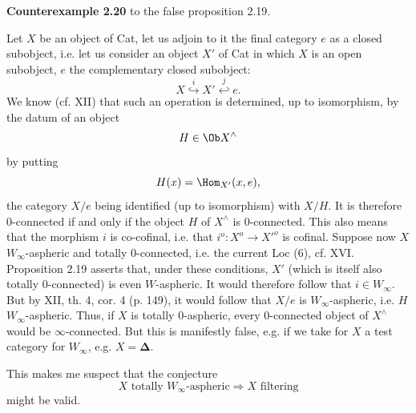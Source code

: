 \noindent\textbf{Counterexample 2.20} to the false proposition 2.19.

Let $X$ be an object of Cat, let us adjoin to it the final category $e$ as a closed subobject, i.e. let us consider an object $X'$ of Cat in which $X$ is an open subobject, $e$ the complementary closed subobject:
\[
X \overset{i}{\hookrightarrow} X' \overset{j}{\hookleftarrow} e.
\]
We know (cf. XII) that such an operation is determined, up to isomorphism, by the datum of an object
\[
H \in \Ob X^\wedge
\]
by putting
\[
H(x) = \Hom_{X'}(x,e),
\]
the category $X/e$ being identified (up to isomorphism) with $X/H$. It is therefore 0-connected if and only if the object $H$ of $X^\wedge$ is 0-connected. This also means that the morphism $i$ is co-cofinal, i.e. that $i^o : X^o \longrightarrow X'^o$ is cofinal. Suppose now $X$ $W_\infty$-aspheric and totally 0-connected, i.e. the current Loc (6), cf. XVI. Proposition 2.19 asserts that, under these conditions, $X'$ (which is itself also totally 0-connected) is even $W$-aspheric. It would therefore follow that $i \in W_\infty$. But by XII, th. 4, cor. 4 (p. 149), it would follow that
$X/e$ is $W_\infty$-aspheric, i.e. $H$ $W_\infty$-aspheric. Thus, if $X$ is totally 0-aspheric, every 0-connected object of $X^\wedge$ would be $\infty$-connected. But this is manifestly false, e.g. if we take for $X$ a test category for $W_\infty$, e.g. $X = \boldsymbol{\Delta}$.

This makes me suspect that the conjecture
\[
X \text{ totally } W_\infty\text{-aspheric} \Longrightarrow X \text{ filtering}
\]
might be valid.